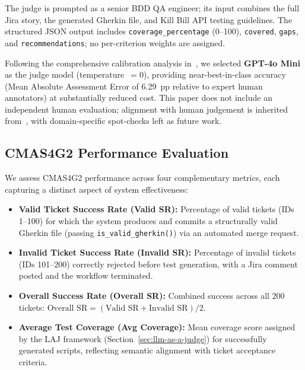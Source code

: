 \documentclass[runningheads]{llncs}
\begin{document}
The judge is prompted as a senior BDD QA engineer; its input combines the full Jira story, the generated Gherkin file, and Kill Bill API testing guidelines. The structured JSON output includes \texttt{coverage\_percentage} (0--100), \texttt{covered}, \texttt{gaps}, and \texttt{recommendations}; no per-criterion weights are assigned.

Following the comprehensive calibration analysis in~\cite{huang2025laj}, we selected \textbf{GPT-4o Mini} as the judge model (temperature~$= 0$), providing near-best-in-class accuracy (Mean Absolute Assessment Error of 6.29~pp relative to expert human annotators) at substantially reduced cost. This paper does not include an independent human evaluation; alignment with human judgement is inherited from~\cite{huang2025laj}, with domain-specific spot-checks left as future work.

\subsection{CMAS4G2 Performance Evaluation}
\label{sec:eval-metrics}
We assess CMAS4G2 performance across four complementary metrics,
each capturing a distinct aspect of system effectiveness:
\begin{itemize}
\item \textbf{Valid Ticket Success Rate (Valid SR):}
Percentage of valid tickets (IDs 1--100) for which the system produces and commits a structurally valid Gherkin file (passing \texttt{is\_valid\_gherkin()}) via an automated merge request.
\item \textbf{Invalid Ticket Success Rate (Invalid SR):}
Percentage of invalid tickets (IDs 101--200) correctly rejected before test generation, with a Jira comment posted and the workflow terminated.
\item \textbf{Overall Success Rate (Overall SR):}
Combined success across all 200 tickets: $\text{Overall SR} = (\text{Valid SR} + \text{Invalid SR})/2$.
\item \textbf{Average Test Coverage (Avg Coverage):}
Mean coverage score assigned by the LAJ framework (Section~\ref{sec:llm-as-a-judge}) for successfully generated scripts, reflecting semantic alignment with ticket acceptance criteria.
\end{itemize}
\end{document}
